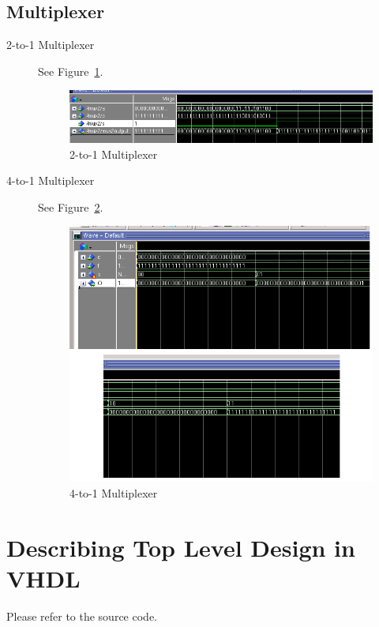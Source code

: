 \documentclass[a4paper]{article}
\begin{document}
\subsection{Multiplexer}
\begin{description}
    \item[2-to-1 Multiplexer] See Figure~\ref{fig:mux2}.

        \begin{figure}[ht!]
            \center
            \includegraphics[scale=0.6]{mux2}
            \caption{2-to-1 Multiplexer}\label{fig:mux2}
        \end{figure}

    \item[4-to-1 Multiplexer] See Figure~\ref{fig:mux4}.

        \begin{figure}[ht!]
            \center
            \includegraphics[scale=0.6]{mux4}
            \caption{4-to-1 Multiplexer}\label{fig:mux4}
        \end{figure}
\end{description}

\section{Describing Top Level Design in VHDL}
Please refer to the source code.
\end{document}
